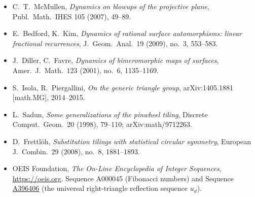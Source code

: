 \documentclass[11pt,a4paper]{article}
\theoremstyle{remark}
\theoremstyle{plain}
\begin{document}
\begin{itemize}[leftmargin=2em,itemsep=0.2em]
\item C.~T.~McMullen, \emph{Dynamics on blowups of the projective
plane}, Publ.\ Math.\ IHES 105 (2007), 49--89.

\item E.~Bedford, K.~Kim, \emph{Dynamics of rational surface
automorphisms: linear fractional recurrences}, J.\ Geom.\ Anal.\ 19
(2009), no.~3, 553--583.

\item J.~Diller, C.~Favre, \emph{Dynamics of bimeromorphic maps of
surfaces}, Amer.\ J.\ Math.\ 123 (2001), no.~6, 1135--1169.

\item S.~Isola, R.~Piergallini, \emph{On the generic triangle group},
arXiv:1405.1881 [math.MG], 2014--2015.

\item L.~Sadun, \emph{Some generalizations of the pinwheel tiling},
Discrete Comput.\ Geom.\ 20 (1998), 79--110; arXiv:math/9712263.

\item D.~Frettl\"oh, \emph{Substitution tilings with statistical
circular symmetry}, European J.\ Combin.\ 29 (2008), no.~8,
1881--1893.

\item OEIS Foundation, \emph{The On-Line Encyclopedia of Integer
Sequences}, \url{https://oeis.org}.  Sequence A000045 (Fibonacci
numbers) and Sequence
\href{https://oeis.org/A396406}{A396406} (the universal
right-triangle reflection sequence $u_d$).
\end{itemize}
\end{document}
